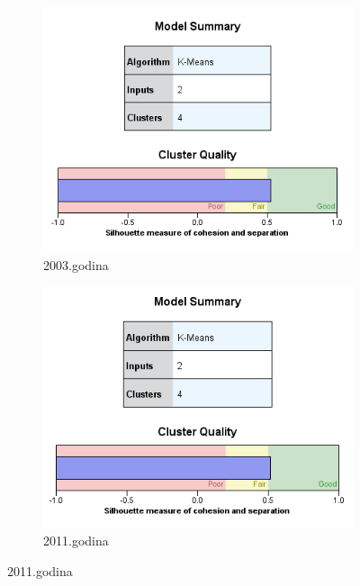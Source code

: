 \documentclass[a4paper]{article}
\begin{document}
\begin{figure}[H]
	\begin{subfigure}[h]{0.45\textwidth}
		\begin{center}
			\includegraphics[scale=0.50]{Klasterovanje/Model_KMeans2003_Silhouette.png}
		\end{center}
		\caption{2003.godina}
		\label{fig:SPSS_Silueta2003}
	\end{subfigure}
	\hfill
	\begin{subfigure}[h]{0.45\textwidth}
		\begin{center}
			\includegraphics[scale=0.50]{Klasterovanje/Model_KMeans2011_Silhouette.png}
		\end{center}
		\caption{2011.godina}
		\label{fig:SPSS_Silueta2011}
	\end{subfigure}
	

\end{figure}
\end{document}
